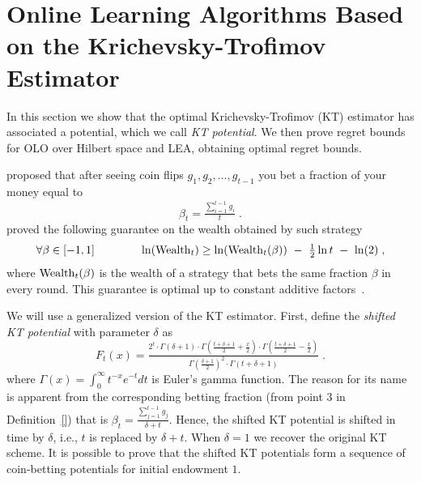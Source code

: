 \section{Online Learning Algorithms Based on the Krichevsky-Trofimov Estimator}
\label{section:kt-estimator}

In this section we show that the optimal Krichevsky-Trofimov (KT) estimator has associated a potential, which we call \emph{KT potential}.
We then prove regret bounds for \ac{OLO} over Hilbert space and \ac{LEA}, obtaining optimal regret bounds.


\citet{KrichevskyT81} proposed that after seeing coin flips $g_1, g_2, \dots, g_{t-1}$ you bet a fraction of your money equal to
\begin{equation}
\label{equation:kt-estimator-betting-strategy}
\beta_t =  \tfrac{\sum_{i=1}^{t-1} g_i}{t} \; .
\end{equation}
\citeauthor{KrichevskyT81} proved the following guarantee on the wealth obtained by such strategy
$$
\forall \beta \in [-1,1] \qquad \qquad \ln(\Wealth_t) \ge \ln(\Wealth_t(\beta)) \ - \ \tfrac{1}{2} \ln t \ - \ \ln(2) \; ,
$$
where $\operatorname{Wealth}_t(\beta)$ is the wealth of a strategy that bets the same fraction
$\beta$ in every round. This guarantee is optimal up to constant additive factors~\citep{Cesa-BianchiL06}.

We will use a generalized version of the KT estimator.
First, define the \emph{shifted KT potential} with parameter $\delta$ as
$$
F_t(x) = \tfrac{2^t \cdot \Gamma\left(\delta + 1 \right) \cdot \Gamma\left(\tfrac{t+\delta+1}{2} + \tfrac{x}{2} \right) \cdot \Gamma\left(\tfrac{t+\delta+1}{2} - \tfrac{x}{2} \right)}{\Gamma\left(\tfrac{\delta+1}{2} \right)^2 \cdot \Gamma \left(t+\delta+1\right)} \; .
$$
where $\Gamma(x) = \int_0^\infty t^{-x} e^{-t} dt$ is Euler's gamma function.
The reason for its name is apparent from the corresponding betting fraction (from point 3 in Definition~\ref{}) that is
$\beta_t = \tfrac{\sum_{j=1}^{t-1} g_j}{\delta+t}$.
Hence, the shifted KT potential is shifted in time by $\delta$, i.e., $t$ is replaced by $\delta+t$.
When $\delta=1$ we recover the original KT scheme.
It is possible to prove that the shifted KT potentials form a sequence of coin-betting potentials for initial endowment $1$.




